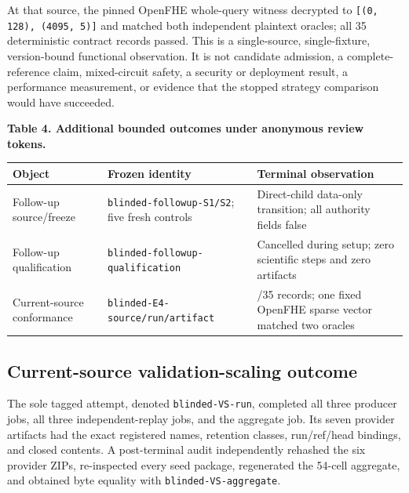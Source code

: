 At that source, the pinned OpenFHE whole-query witness decrypted to
\texttt{[(0, 128), (4095, 5)]} and matched both independent plaintext oracles;
all 35 deterministic contract records passed. This is a single-source,
single-fixture, version-bound functional observation. It is not candidate
admission, a complete-reference claim, mixed-circuit safety, a security or
deployment result, a performance measurement, or evidence that the stopped
strategy comparison would have succeeded.

\textbf{Table 4. Additional bounded outcomes under anonymous review tokens.}

{\small{}
\begin{longtable}[]{@{}
  >{\raggedright\arraybackslash}p{}
  >{\raggedright\arraybackslash}p{}
  >{\raggedright\arraybackslash}p{}@{}}
\toprule\noalign{}
Object & Frozen identity & Terminal observation \\
\midrule\noalign{}
\endhead
\bottomrule\noalign{}
\endlastfoot
Follow-up source/freeze & \texttt{blinded-followup-S1/S2}; five fresh controls & Direct-child data-only transition; all authority fields false \\
Follow-up qualification & \texttt{blinded-followup-}\allowbreak\texttt{qualification} & Cancelled during setup; zero scientific steps and zero artifacts \\
Current-source conformance & \texttt{blinded-E4-source/}\allowbreak\texttt{run/}\allowbreak\texttt{artifact} & 35/35 records; one fixed OpenFHE sparse vector matched two oracles \\
\end{longtable}
}

\subsection{Current-source validation-scaling outcome}\label{current-source-validation-scaling-outcome}

The sole tagged attempt, denoted \texttt{blinded-VS-run}, completed all three
producer jobs, all three independent-replay jobs, and the aggregate job. Its
seven provider artifacts had the exact registered names, retention classes,
run/ref/head bindings, and closed contents. A post-terminal audit independently
rehashed the six provider ZIPs, re-inspected every seed package, regenerated
the 54-cell aggregate, and obtained byte equality with
\texttt{blinded-VS-aggregate}.

